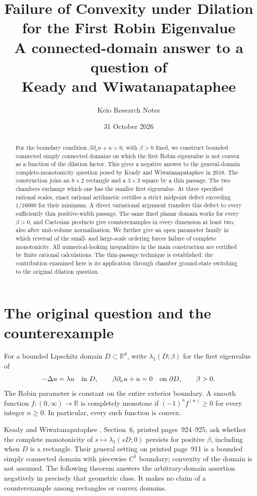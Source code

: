 \documentclass[11pt,a4paper]{article}
\title{Failure of Convexity under Dilation\\for the First Robin Eigenvalue\\[5pt]
\large A connected-domain answer to a question of\\Keady and Wiwatanapataphee}
\author{Keio Research Notes}
\date{31 October 2026}
\theoremstyle{definition}\newtheorem{definition}[theorem]{Definition}
\theoremstyle{remark}\newtheorem{remark}[theorem]{Remark}
\begin{document}
\maketitle
\begin{abstract}
For the boundary condition $\beta\partial_\nu u+u=0$, with
$\beta>0$ fixed, we construct bounded connected simply connected
domains on which the first Robin eigenvalue is not convex as a
function of the dilation factor. This gives a negative answer to
the general-domain complete-monotonicity question posed by Keady
and Wiwatanapataphee in 2018. The construction joins an $8\times2$
rectangle and a $3\times3$ square by a thin passage. The two
chambers exchange which one has the smaller first eigenvalue.
At three specified rational scales, exact rational arithmetic
certifies a strict midpoint defect exceeding $1/16000$ for their
minimum. A direct variational argument transfers this defect to
every sufficiently thin positive-width passage. The same fixed
planar domain works for every $\beta>0$, and Cartesian products
give counterexamples in every dimension at least two, also after
unit-volume normalization. We further give an open parameter
family in which reversal of the small- and large-scale ordering
forces failure of complete monotonicity. All numerical-looking
inequalities in the main construction are certified by finite
rational calculations. The thin-passage technique is established;
the contribution examined here is its application through chamber
ground-state switching to the original dilation question.
\end{abstract}

\section{The original question and the counterexample}

For a bounded Lipschitz domain $D\subset\mathbb R^d$, write
$\lambda_1(D;\beta)$ for the first eigenvalue of
\begin{equation}\label{eq:boundary}
 -\Delta u=\lambda u\quad\hbox{in }D,\qquad
 \beta\partial_\nu u+u=0\quad\hbox{on }\partial D,
 \qquad \beta>0.
\end{equation}
The Robin parameter is constant on the entire exterior boundary.
A smooth function $f:(0,\infty)\to\mathbb R$ is completely
monotone if $(-1)^n f^{(n)}\ge0$ for every integer $n\ge0$.
In particular, every such function is convex.

Keady and Wiwatanapataphee \cite{KW2018}, Section~6, printed
pages~924--925, ask whether the complete monotonicity of
$s\mapsto\lambda_1(sD;0)$ persists for positive $\beta$, including
when $D$ is a rectangle. Their general setting on printed
page~911 is a bounded simply connected domain with piecewise
$C^1$ boundary; convexity of the domain is not assumed. The
following theorem answers the arbitrary-domain assertion
negatively in precisely that geometric class. It makes no claim
of a counterexample among rectangles or convex domains.
\end{document}
